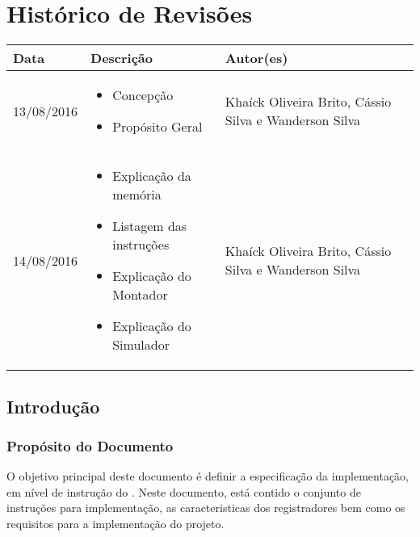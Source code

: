 \documentclass{report}
\begin{document}

\capa
\newpage
\newpage

\chapter*{Histórico de Revisões}
  \vspace*{1cm}
  \begin{table}[ht]
    \centering
    \begin{tabular}[pos]{|m{2cm} | m{8cm} | m{4cm}|} 
      \hline
      \cellcolor[gray]{0.9}
      \textbf{Data} & \cellcolor[gray]{0.9}\textbf{Descrição} & \cellcolor[gray]{0.9}\textbf{Autor(es)}\\
      \hline    
      13/08/2016 &
       \begin{itemize} 
       \item Concepção
       \item Propósito Geral
       \end{itemize}
      & Khaíck Oliveira Brito, Cássio Silva e Wanderson Silva \\ \hline
      14/08/2016 &
      \begin{itemize} 
       \item Explicação da memória 
       \item Listagem das instruções
       \item Explicação do Montador
       \item Explicação do Simulador
       \end{itemize}
      & Khaíck Oliveira Brito, Cássio Silva e Wanderson Silva \\ \hline
    \end{tabular}
  \end{table}

\tableofcontents

\newpage
\section{Introdução}
  
\subsection{Propósito do Documento}
O objetivo principal deste documento é definir a especificação da implementação, em nível de instrução do \ipPROCESSProject. Neste documento, está contido o conjunto de instruções para implementação, as caracteristicas dos registradores bem como os requisitos para a implementação do projeto.
\end{document}
